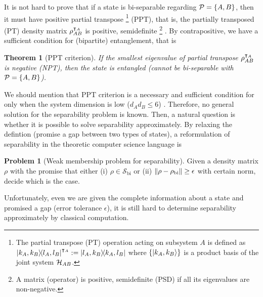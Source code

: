\documentclass[
aps,
pra,
twocolumn,
floatfix,
]{revtex4-2}
\theoremstyle{plain}
\newtheorem{theorem}{Theorem}
\theoremstyle{definition}
\newtheorem{problem}{Problem}
\newcommand{\dm}{\rho}
\newcommand{\bi}{\text{bi}}
\newcommand{\ppt}{\textup{PPT}}
\newcommand{\separable}{\mathcal{S}}
\newcommand{\ppartition}{\mathcal{P}}
\begin{document}
It is not hard to prove that if a state is bi-separable regarding $\ppartition=\qty{A,B}$, then it must have positive partial transpose 
\footnote{
	The partial transpose (PT) operation acting on subsystem $A$ is defined as
	$\op{k_A,k_B}{l_A,l_B}^{\intercal_A} := \op{l_A,k_B}{k_A,l_B}$
	where $\qty{\ket{k_A,k_B}}$ is a product basis of the joint system $\mathcal{H}_{AB}$.
} (PPT), 
that is, the partially transposed (PT) density matrix $\dm_{AB}^{\T_A}$ is positive, semidefinite \footnote{A matrix (operator) is positive, semidefinite (PSD) if all its eigenvalues are non-negative.} \cite{peresSeparabilityCriterionDensity1996} \cite{horodeckiSeparabilityMixedStates1996}.
By contrapositive, we have a sufficient condition for (bipartite) entanglement, that is
\begin{theorem}[PPT criterion]\label{thm:ppt}
	If the smallest eigenvalue of partial transpose $\dm_{AB}^{\T_A}$ is negative (NPT), then the state is entangled (cannot be bi-separable with $\ppartition=\qty{A,B}$).
\end{theorem}
We should mention that PPT criterion is a necessary and sufficient condition for  only when the system dimension is low ($d_A d_B \le 6$) \cite{horodeckiSeparabilityMixedStates1996}.
Therefore, no general solution for the separability problem is known.
Then, a natural question is whether it is possible to solve separability approximately.
By relaxing the defintion (promise a gap between two types of states), a reformulation of separability in the theoretic computer science language is
\begin{problem}[Weak membership problem for separability]\label{prm:weak_membership problem_for_separability}
	Given a density matrix $\dm$ with the promise that either (i) $\dm\in \separable_{\bi}$ or (ii) $\norm{\dm-\dm_{\bi}}\ge \epsilon$ with certain norm, decide which is the case.
\end{problem}
Unfortunately, even we are given the complete information about a state and promised a gap (error tolerance $\epsilon$), it is still hard to determine separability approximately by classical computation.
\end{document}
